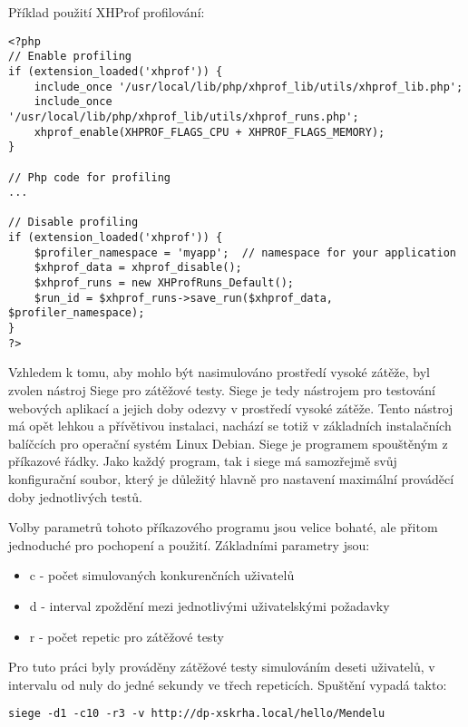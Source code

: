 \documentclass[12pt]{article}
\begin{document}
\newpage
Příklad použití XHProf profilování:
\begin{scriptsize}
\begin{verbatim}
<?php
// Enable profiling
if (extension_loaded('xhprof')) {
    include_once '/usr/local/lib/php/xhprof_lib/utils/xhprof_lib.php';
    include_once '/usr/local/lib/php/xhprof_lib/utils/xhprof_runs.php';
    xhprof_enable(XHPROF_FLAGS_CPU + XHPROF_FLAGS_MEMORY);
}

// Php code for profiling
...

// Disable profiling
if (extension_loaded('xhprof')) {
    $profiler_namespace = 'myapp';  // namespace for your application
    $xhprof_data = xhprof_disable();
    $xhprof_runs = new XHProfRuns_Default();
    $run_id = $xhprof_runs->save_run($xhprof_data, $profiler_namespace);
}
?>
\end{verbatim}
\end{scriptsize}

Vzhledem k tomu, aby mohlo být nasimulováno prostředí vysoké zátěže, byl zvolen nástroj Siege pro zátěžové testy. Siege je tedy nástrojem pro testování webových aplikací a jejich doby odezvy v prostředí vysoké zátěže. Tento nástroj má opět lehkou a přívětivou instalaci, nachází se totiž v základních instalačních balíčcích pro operační systém Linux Debian. Siege je programem spouštěným z příkazové řádky. Jako každý program, tak i siege má samozřejmě svůj konfigurační soubor, který je důležitý hlavně pro nastavení maximální prováděcí doby jednotlivých testů.

Volby parametrů tohoto příkazového programu jsou velice bohaté, ale přitom jednoduché pro pochopení a použití. Základními parametry jsou:

\begin{itemize}
\item c - počet simulovaných konkurenčních uživatelů
\item d - interval zpoždění mezi jednotlivými uživatelskými požadavky
\item r - počet repetic pro zátěžové testy
\end{itemize}

Pro tuto práci byly prováděny zátěžové testy simulováním deseti uživatelů, v intervalu od nuly do jedné sekundy ve třech repeticích. Spuštění vypadá takto:
\begin{scriptsize}
\begin{verbatim}
siege -d1 -c10 -r3 -v http://dp-xskrha.local/hello/Mendelu
\end{verbatim}
\end{scriptsize}
\end{document}
